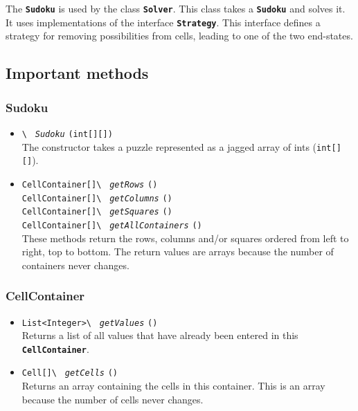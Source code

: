 \documentclass[11pt, a4paper, fleqn]{article}
\newcommand{\class}[1]{{\color{class}\textbf{\lstinline{#1}}}}
\newcommand{\method}[3]{%
\lstinline{#1\ }%
{\color{method}\textit{\lstinline{#2}}}%
\lstinline{(#3)}%
}
\newcommand{\java}[1]{\lstinline{#1}}
\begin{document}
The \class{Sudoku} is used by the class \class{Solver}. This class takes a \class{Sudoku} and solves it.
It uses implementations of the interface \class{Strategy}. This interface defines a strategy for
removing possibilities from cells, leading to one of the two end-states.

\subsection{Important methods}
\subsubsection{Sudoku}
\begin{itemize}
\item \method{}{Sudoku}{int[][]}\\
The constructor takes a puzzle represented as a jagged array of ints (\java{int[][]}).

\item \method{CellContainer[]}{getRows}{}\\
      \method{CellContainer[]}{getColumns}{}\\
      \method{CellContainer[]}{getSquares}{}\\
      \method{CellContainer[]}{getAllContainers}{}\\
These methods return the rows, columns and/or squares ordered from left to right, top to bottom.
The return values are arrays because the number of containers never changes.
\end{itemize}
\subsubsection{CellContainer}
\begin{itemize}
\item \method{List<Integer>}{getValues}{}\\
Returns a list of all values that have already been entered in this
\\\class{CellContainer}.
\item \method{Cell[]}{getCells}{}\\
Returns an array containing the cells in this container. This is an array because the number
of cells never changes.
\end{itemize}
\end{document}
